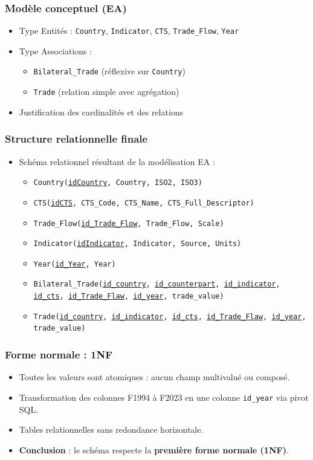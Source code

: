 \documentclass[11pt]{beamer}
\begin{document}
\begin{frame}
  \frametitle{Modèle conceptuel (EA)}
  \begin{itemize}
    \item<1-> Type Entités : \texttt{Country}, \texttt{Indicator}, \texttt{CTS}, \texttt{Trade\_Flow}, \texttt{Year}
    \item<2-> Type Associations : 
      \begin{itemize}
        \item \texttt{Bilateral\_Trade} (réflexive sur \texttt{Country})
        \item \texttt{Trade} (relation simple avec agrégation)
      \end{itemize}
    \item<3-> Justification des cardinalités et des relations
  \end{itemize}
\end{frame}

\begin{frame}
  \frametitle{Structure relationnelle finale}
  \begin{itemize}
    \item Schéma relationnel résultant de la modélisation EA :
    \begin{itemize}
      \item \texttt{Country(\underline{idCountry}, Country, ISO2, ISO3)}
      \item \texttt{CTS(\underline{idCTS}, CTS\_Code, CTS\_Name, CTS\_Full\_Descriptor)}
      \item \texttt{Trade\_Flow(\underline{id\_Trade\_Flow}, Trade\_Flow, Scale)}
      \item \texttt{Indicator(\underline{idIndicator}, Indicator, Source, Units)}
      \item \texttt{Year(\underline{id\_Year}, Year)}
      \item \texttt{Bilateral\_Trade(\underline{id\_country}, \underline{id\_counterpart}, \underline{id\_indicator}, \underline{id\_cts}, \underline{id\_Trade\_Flaw}, \underline{id\_year}, trade\_value)}
      \item \texttt{Trade(\underline{id\_country}, \underline{id\_indicator}, \underline{id\_cts}, \underline{id\_Trade\_Flaw}, \underline{id\_year}, trade\_value)}
    \end{itemize}
  \end{itemize}
\end{frame}

\begin{frame}
  \frametitle{Forme normale : 1NF}
  \begin{itemize}
    \item Toutes les valeurs sont atomiques : aucun champ multivalué ou composé.
    \item Transformation des colonnes F1994 à F2023 en une colonne \texttt{id\_year} via pivot SQL.
    \item Tables relationnelles sans redondance horizontale.
    \item \textbf{Conclusion} : le schéma respecte la \textbf{première forme normale (1NF)}.
  \end{itemize}
\end{frame}
\end{document}
